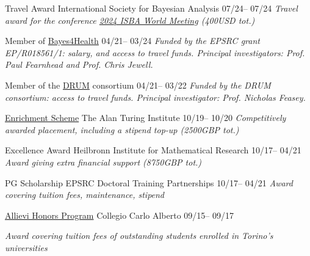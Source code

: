 
\begin{cvhonors}

	\cvhonor
	{Travel Award}
	{International Society for Bayesian Analysis}
	{}%
	{07\slash 24-- 07\slash 24}
	\extracvhonor
	{}
	{\emph{Travel award for the conference \href{https://unive.it/web/en/2208/home}{2024 ISBA World Meeting} (400USD tot.)}}
	{}
	{}
 
    
    \cvhonor
	{Member of \href{https://www.lancaster.ac.uk/bayes-for-health/}{Bayes4Health}}
	{}
	{}%
	{04\slash 21-- 03\slash 24}
	\extracvhonor
	{}
	{\emph{Funded by the EPSRC grant EP/R018561/1: salary, and access to travel funds. Principal investigators: Prof. Paul Fearnhead and Prof. Chris Jewell.}}
	{}
	{}

    \cvhonor
	{Member of the \href{https://www.drumconsortium.org/}{DRUM} consortium}
	{}
	{}%
	{04\slash 21-- 03\slash 22}
	\extracvhonor
	{}
	{\emph{Funded by the DRUM consortium: access to travel funds. Principal investigator: Prof. Nicholas Feasey.}}
	{}
	{}

	\cvhonor
	{\href{https://www.turing.ac.uk/work-turing/studentships/enrichment}{Enrichment Scheme}}
	{The Alan Turing Institute}
	{}%
	{10\slash 19-- 10\slash 20}
	\extracvhonor
	{}
	{\emph{Competitively awarded placement, including a stipend top-up (2500GBP tot.)}}
	{}
	{}
	
	\cvhonor
	{Excellence Award}
	{Heilbronn Institute for Mathematical Research}
	{}%
	{10\slash 17-- 04\slash 21}
	\extracvhonor
	{}
	{\emph{Award giving extra financial support (8750GBP tot.)}}
	{}
	{}
	
	\cvhonor
	{PG Scholarship}
	{EPSRC Doctoral Training Partnerships}
	{}
	{10\slash 17-- 04\slash 21}
	\extracvhonor
	{}
	{\emph{Award covering tuition fees, maintenance, stipend}}
	{}
	{}
	
	
	\cvhonor
	{\href{https://www.carloalberto.org/education/allievi-honors-program/}{Allievi Honors Program}}
	{Collegio Carlo Alberto}
	{}
	{09\slash 15-- 09\slash 17}
	
	\extracvhonor
	{}
	{\emph{Award covering tuition fees of outstanding students enrolled in Torino's universities}}
	{}
	{}
	
\end{cvhonors}